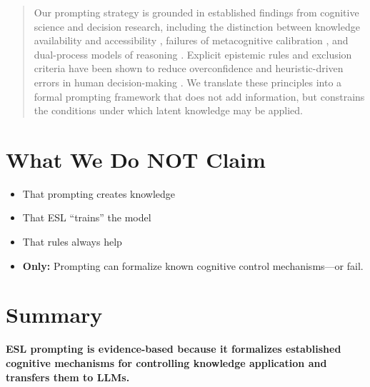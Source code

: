 \documentclass[11pt,a4paper]{article}
\begin{document}
\begin{quote}
Our prompting strategy is grounded in established findings from cognitive science and decision research, including the distinction between knowledge availability and accessibility \citep{tulving1966availability}, failures of metacognitive calibration \citep{rozenblit2002misunderstood}, and dual-process models of reasoning \citep{kahneman2011thinking}. Explicit epistemic rules and exclusion criteria have been shown to reduce overconfidence and heuristic-driven errors in human decision-making \citep{kahneman2021noise}. We translate these principles into a formal prompting framework that does not add information, but constrains the conditions under which latent knowledge may be applied.
\end{quote}


\section{What We Do NOT Claim}

\begin{itemize}
    \item[$\times$] That prompting creates knowledge
    \item[$\times$] That ESL ``trains'' the model
    \item[$\times$] That rules always help
\end{itemize}

\begin{itemize}
    \item[$\checkmark$] \textbf{Only:} Prompting can formalize known cognitive control mechanisms---or fail.
\end{itemize}


\section{Summary}

\begin{keypoint}
\textbf{ESL prompting is evidence-based because it formalizes established cognitive mechanisms for controlling knowledge application and transfers them to LLMs.}
\end{keypoint}
\end{document}
